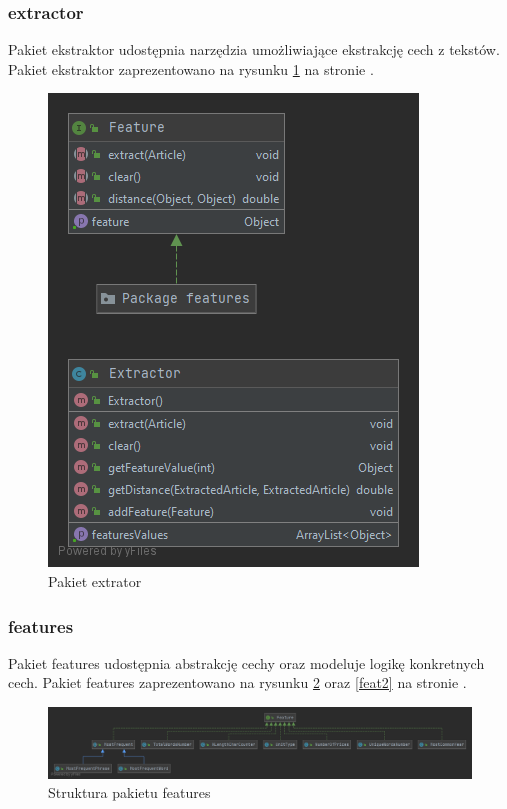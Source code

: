 \documentclass{classrep}
\begin{document}
\subsubsection{extractor}
Pakiet ekstraktor udostępnia narzędzia umożliwiające ekstrakcję cech z tekstów. Pakiet ekstraktor zaprezentowano na rysunku \ref{extr} na stronie \pageref{extr}.
\begin{figure}
\label{extr}
\includegraphics[scale=0.5]{Package extractor}
\caption{Pakiet extrator}
\end{figure}


\subsubsection{features}
Pakiet features udostępnia abstrakcję cechy oraz modeluje logikę konkretnych cech. Pakiet features zaprezentowano na rysunku \ref{feat} oraz \ref{feat2} na stronie \pageref{feat}.
\begin{figure}
\label{feat}
\includegraphics[scale=0.20]{Features structure}
\caption{Struktura pakietu features}
\end{figure}
\newline
\end{document}
